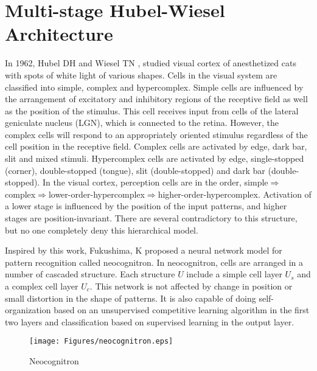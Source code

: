 \documentclass{llncs}
\begin{document}
\section{Multi-stage Hubel-Wiesel Architecture}
In 1962, Hubel DH and Wiesel TN \cite{Hubel1962}, \cite{Hubel1965a}  studied visual cortex of anesthetized cats  with   spots of white light of various shapes. Cells in the visual system are classified    into  simple, complex and hypercomplex. Simple cells are influenced  by the arrangement of  excitatory and inhibitory regions of the receptive field as well as the position of the stimulus. This cell receives input from cells of the lateral geniculate nucleus (LGN), which is connected to the retina. However, the complex cells will respond to  an appropriately  oriented stimulus regardless of the cell position in the receptive field. Complex cells are activated by edge, dark bar, slit and mixed stimuli. Hypercomplex cells are activated by edge, single-stopped (corner), double-stopped (tongue), slit (double-stopped) and dark bar (double-stopped).
 In the visual cortex, perception cells are in the  order, simple$\Longrightarrow$complex$\Longrightarrow$lower-order-hypercomplex$\Longrightarrow$higher-order-hypercomplex. Activation of  a lower stage is  influenced by  the position of the input patterns, and  higher stages are  position-invariant. There are several  contradictory to this structure, but no one   completely deny this hierarchical model.
\par Inspired by this work, Fukushima, K \cite{Stark1980} proposed a neural network model for pattern recognition called neocognitron.
In neocognitron, cells are arranged in  a number of  cascaded structure. Each  structure $U$ include a  simple cell layer $U_s$ and a complex cell layer $U_c$. This network is not affected by change in position or small distortion in the shape of patterns.  It is also capable of doing self-organization based on an unsupervised competitive learning algorithm \cite{Fukushima1982} in the first two layers and classification based on  supervised learning in the output layer.
\vspace*{-8mm}
\begin{figure}[ht]
 \centering
 \texttt{[image: Figures/neocognitron.eps]}
 \captionsetup{justification=centering,belowskip=0pt,aboveskip=0pt}
\caption{Neocognitron}
\label{neo}
\end{figure}
\vspace*{-8mm}
\end{document}
